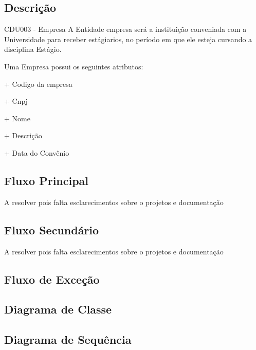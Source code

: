 \subsection{Descrição}
CDU003 - Empresa
  A Entidade empresa será a instituição conveniada com a Universidade para receber estágiarios, no período em que ele esteja cursando a disciplina Estágio.

Uma Empresa possui os seguintes atributos:


+ Codigo da empresa

+ Cnpj

+ Nome

+ Descrição

+ Data do Convênio

\subsection{Fluxo Principal}

A resolver pois falta esclarecimentos sobre o projetos e documentação

\subsection{Fluxo Secundário}

A resolver pois falta esclarecimentos sobre o projetos e documentação

\subsection{Fluxo de Exceção}

\subsection{Diagrama de Classe}

\subsection{Diagrama de Sequência}